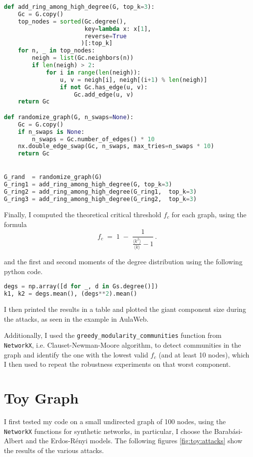 \documentclass{article}
\begin{document}
\begin{lstlisting}[language=Python, caption={Edge augmentation.}]
def add_ring_among_high_degree(G, top_k=3):
    Gc = G.copy()
    top_nodes = sorted(Gc.degree(), 
                       key=lambda x: x[1], 
                       reverse=True
                      )[:top_k]
    for n, _ in top_nodes:
        neigh = list(Gc.neighbors(n))
        if len(neigh) > 2:
            for i in range(len(neigh)):
                u, v = neigh[i], neigh[(i+1) % len(neigh)]
                if not Gc.has_edge(u, v):
                    Gc.add_edge(u, v)
    return Gc

def randomize_graph(G, n_swaps=None):
    Gc = G.copy()
    if n_swaps is None:
        n_swaps = Gc.number_of_edges() * 10
    nx.double_edge_swap(Gc, n_swaps, max_tries=n_swaps * 10)
    return Gc


G_rand  = randomize_graph(G)
G_ring1 = add_ring_among_high_degree(G, top_k=3)
G_ring2 = add_ring_among_high_degree(G_ring1,  top_k=3)
G_ring3 = add_ring_among_high_degree(G_ring2,  top_k=3)
\end{lstlisting}

Finally, I computed the theoretical critical threshold $f_c$ for each graph, using the formula 
$$
f_c \;=\;1 \;-\;\frac{1}{\frac{\langle k^2\rangle}{\langle k\rangle}-1}\,.
$$

and the first and second moments of the degree distribution using the following python code.
\begin{lstlisting}[language=Python, caption={First and second moments of the degree distribution.}]
degs = np.array([d for _, d in Gs.degree()])
k1, k2 = degs.mean(), (degs**2).mean()
\end{lstlisting}

I then printed the results in a table and plotted the giant component size during the attacks, as seen in the example in AulaWeb.

Additionally, I used the \texttt{greedy\_modularity\_communities} function from \texttt{NetworkX}, i.e. Clauset-Newman-Moore algorithm, to detect communities in the graph and identify the one with the lowest valid $f_c$ (and at least 10 nodes), which I then used to repeat the robustness experiments on that worst component.


\section{Toy Graph}\label{sec:toy}
I first tested my code on a small undirected graph of 100 nodes, using the \texttt{NetworkX} functions for synthetic networks, in particular, I choose the Barabási-Albert and the Erdos-Rényi models. 
The following figures \ref{fig:toy:attacks} show the results of the various attacks.
\end{document}
